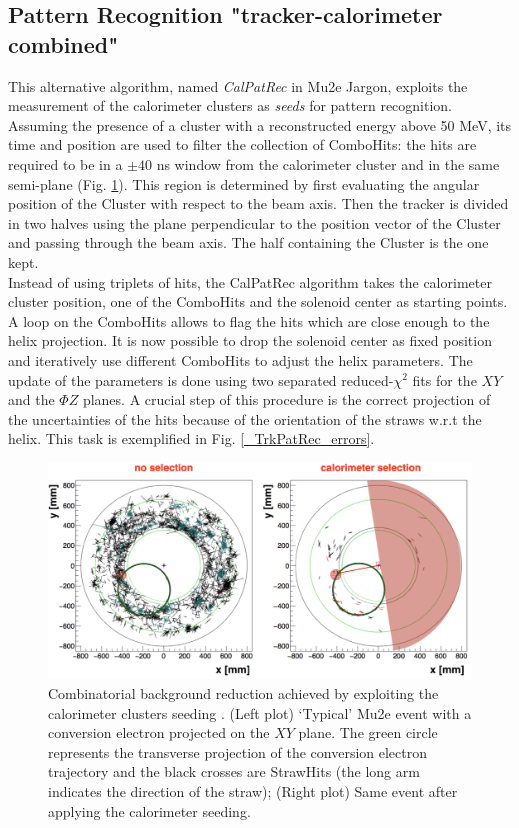 \documentclass[12pt,a4paper,openright, oneside, titlepage]{book} %
\begin{document}
\subsection{Pattern Recognition "tracker-calorimeter combined"}
This alternative algorithm, named \textit{CalPatRec} in Mu2e Jargon, 
exploits the measurement of the calorimeter clusters as \textit{seeds} for pattern recognition. 
Assuming the presence of a cluster with a reconstructed energy above 50 MeV, 
its time and position are used to filter the collection of ComboHits: 
the hits are required to be in a $\pm 40$ ns window from the calorimeter cluster 
and in the same semi-plane (Fig. \ref{_CalPatRec_semiplane}). 
This region is determined by first evaluating the angular position of the Cluster with respect to the beam axis. Then the tracker is divided in two halves using the plane perpendicular to the position vector of the Cluster and passing through the beam axis. The half containing the Cluster is the one kept.\\
Instead of using triplets of hits, the CalPatRec algorithm takes the calorimeter cluster position, one of the ComboHits and the solenoid center as starting points.
A loop on the ComboHits allows to flag the hits which are close enough to the helix projection. 
It is now possible to drop the solenoid center as fixed position and iteratively use different ComboHits to adjust the helix parameters.
The update of the parameters is done using two separated reduced-$\chi^2$ fits for the $XY$ and the $\Phi Z$ planes. 
A crucial step of this procedure is the correct projection of the uncertainties of the hits because of the orientation of the straws w.r.t the helix. This task is exemplified in Fig. \ref{_TrkPatRec_errors}.

\begin{figure}[h!]
\centering
\includegraphics[scale=0.6]{giani_CalPatRec_semiplane}
\caption{Combinatorial background reduction achieved by exploiting the calorimeter clusters seeding \cite{GianiPatRec:2020}. 
(Left plot)  `Typical' Mu2e event with a conversion electron projected on the $XY$ plane. 
The green circle represents the transverse projection of the conversion electron trajectory 
and the black crosses are StrawHits (the long arm indicates the direction of the straw); 
(Right plot) Same event after applying the calorimeter seeding.}
\label{_CalPatRec_semiplane}
\end{figure}
\end{document}
